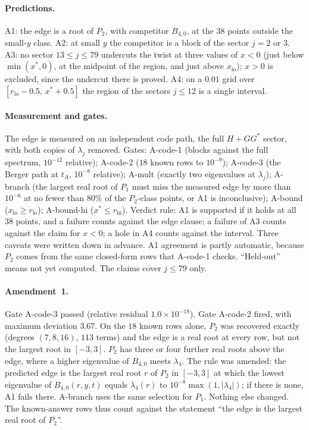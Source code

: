 \documentclass[11pt]{article}
\theoremstyle{definition}
\theoremstyle{remark}
\begin{document}
\paragraph{Predictions.} A1: the edge is a root of $P_2$, with competitor $B_{4,0}$, at the $38$ points outside the
small-$y$ class. A2: at small $y$ the competitor is a block of the sector $j=2$ or $3$. A3: no sector $13\le j\le79$
undercuts the twist at three values of $x<0$ (just below $\min(x^*,0)$, at the midpoint of the region, and just above
$x_{\mathrm{lo}}$); $x>0$ is excluded, since the undercut there is proved. A4: on a $0.01$ grid over
$[r_{\mathrm{lo}}-0.5,\,x^*+0.5]$ the region of the sectors $j\le12$ is a single interval.

\paragraph{Measurement and gates.} The edge is measured on an independent code path, the full $H+GG^*$ sector, with
both copies of $\lambda_j$ removed. Gates: A-code-1 (blocks against the full spectrum, $10^{-12}$ relative); A-code-2
($18$ known rows to $10^{-9}$); A-code-3 (the Berger path at $t_A$, $10^{-8}$ relative); A-mult (exactly two eigenvalues
at $\lambda_j$); A-branch (the largest real root of $P_1$ must miss the measured edge by more than $10^{-6}$ at no fewer
than $80\%$ of the $P_2$-class points, or A1 is inconclusive); A-bound ($x_{\mathrm{lo}}\ge r_{\mathrm{lo}}$); A-bound-hi
($x^*\le r_{\mathrm{hi}}$). Verdict rule: A1 is supported if it holds at all $38$ points, and a failure counts against the
edge clause; a failure of A3 counts against the claim for $x<0$; a hole in A4 counts against the interval. Three caveats
were written down in advance. A1 agreement is partly automatic, because $P_2$ comes from the same closed-form rows that
A-code-1 checks. ``Held-out'' means not yet computed. The claims cover $j\le79$ only.

\paragraph{Amendment~1.} Gate A-code-3 passed (relative residual $1.0\times10^{-18}$). Gate A-code-2 fired, with
maximum deviation $3.67$. On the $18$ known rows alone, $P_2$ was recovered exactly (degrees $(7,8,16)$, $113$ terms) and the
edge is a real root at every row, but not the largest root in $[-3,3]$. $P_2$ has three or four further real roots above
the edge, where a higher eigenvalue of $B_{4,0}$ meets $\lambda_4$. The rule was amended: the predicted edge is the
largest real root $r$ of $P_2$ in $[-3,3]$ at which the lowest eigenvalue of $B_{4,0}(r,y,t)$ equals $\lambda_4(r)$ to
$10^{-8}\max(1,|\lambda_4|)$; if there is none, A1 fails there. A-branch uses the same selection for $P_1$. Nothing else
changed. The known-answer rows thus count against the statement ``the edge is the largest real root of $P_2$''.
\end{document}
